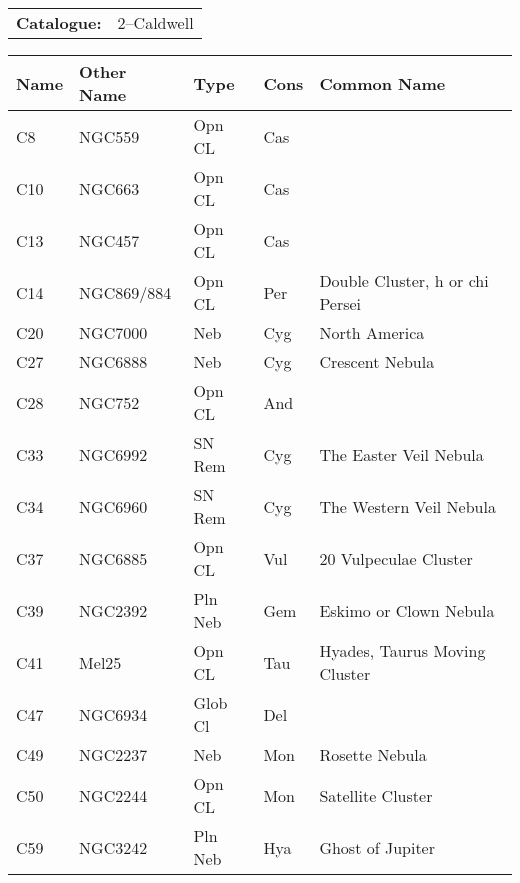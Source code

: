\begin{tabular}{ p{0.9in} p{1.3in}}
{\bf Catalogue:} & 2--Caldwell \\ 
\end{tabular}
\begin{longtable}{ p{0.7in}  p{1.0in}  p{0.6in}  p{0.9in}  p{5.1in} }
\hline 
{\bf Name} & {\bf Other Name} & {\bf Type} & {\bf Cons} & {\bf Common Name} \\ 
\hline 
C8 & NGC559 & Opn CL & Cas &  \\ 
C10 & NGC663 & Opn CL & Cas &  \\ 
C13 & NGC457 & Opn CL & Cas &  \\ 
C14 & NGC869/884 & Opn CL & Per & Double Cluster, h or chi Persei \\ 
C20 & NGC7000 & Neb & Cyg & North America \\ 
C27 & NGC6888 & Neb & Cyg & Crescent Nebula \\ 
C28 & NGC752 & Opn CL & And &  \\ 
C33 & NGC6992 & SN Rem & Cyg & The Easter Veil Nebula \\ 
C34 & NGC6960 & SN Rem & Cyg & The Western Veil Nebula \\ 
C37 & NGC6885 & Opn CL & Vul & 20 Vulpeculae Cluster \\ 
C39 & NGC2392 & Pln Neb & Gem & Eskimo or Clown Nebula \\ 
C41 & Mel25 & Opn CL & Tau & Hyades, Taurus Moving Cluster \\ 
C47 & NGC6934 & Glob Cl & Del &  \\ 
C49 & NGC2237 & Neb & Mon & Rosette Nebula \\ 
C50 & NGC2244 & Opn CL & Mon & Satellite Cluster \\ 
C59 & NGC3242 & Pln Neb & Hya & Ghost of Jupiter \\ 
\hline 
\end{longtable} 

